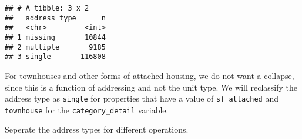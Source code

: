 \documentclass[]{article}
\newenvironment{Shaded}{\begin{snugshade}}{\end{snugshade}}
\newcommand{\KeywordTok}[1]{\textcolor[rgb]{0.13,0.29,0.53}{\textbf{#1}}}
\newcommand{\DataTypeTok}[1]{\textcolor[rgb]{0.13,0.29,0.53}{#1}}
\newcommand{\StringTok}[1]{\textcolor[rgb]{0.31,0.60,0.02}{#1}}
\newcommand{\OtherTok}[1]{\textcolor[rgb]{0.56,0.35,0.01}{#1}}
\newcommand{\ControlFlowTok}[1]{\textcolor[rgb]{0.13,0.29,0.53}{\textbf{#1}}}
\newcommand{\OperatorTok}[1]{\textcolor[rgb]{0.81,0.36,0.00}{\textbf{#1}}}
\newcommand{\NormalTok}[1]{#1}
\begin{document}
\begin{Shaded}
\end{Shaded}

\begin{verbatim}
## # A tibble: 3 x 2
##   address_type      n
##   <chr>         <int>
## 1 missing       10844
## 2 multiple       9185
## 3 single       116808
\end{verbatim}

\begin{Shaded}
\end{Shaded}

For townhouses and other forms of attached housing, we do not want a
collapse, since this is a function of addressing and not the unit type.
We will reclassify the address type as \texttt{single} for properties
that have a value of \texttt{sf\ attached} and \texttt{townhouse} for
the \texttt{category\_detail} variable.

\begin{Shaded}
\end{Shaded}

Seperate the address types for different operations.
\end{document}
